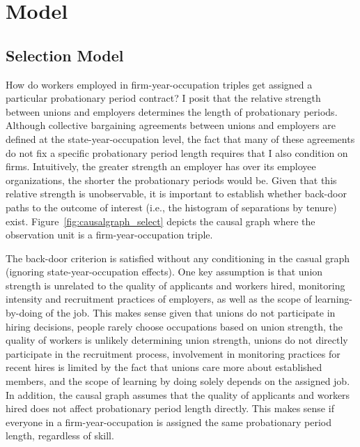 \documentclass[12pt]{article}
\begin{document}
\section{Model}

\subsection{Selection Model}

How do workers employed in firm-year-occupation triples get assigned a particular probationary period contract?
I posit that the relative strength between unions and employers determines the length of probationary periods.
Although collective bargaining agreements between unions and employers are defined at the state-year-occupation level, the fact that many of these agreements do not fix a specific probationary period length requires that I also condition on firms.
Intuitively, the greater strength an employer has over its employee organizations, the shorter the probationary periods would be.
Given that this relative strength is unobservable, it is important to establish whether back-door paths to the outcome of interest (i.e., the histogram of separations by tenure) exist.
Figure~\ref{fig:causalgraph_select} depicts the causal graph where the observation unit is a firm-year-occupation triple.

The back-door criterion is satisfied without any conditioning in the casual graph (ignoring state-year-occupation effects).
One key assumption is that union strength is unrelated to the quality of applicants and workers hired, monitoring intensity and recruitment practices of employers, as well as the scope of learning-by-doing of the job.
This makes sense given that unions do not participate in hiring decisions, people rarely choose occupations based on union strength, the quality of workers is unlikely determining union strength, unions do not directly participate in the recruitment process, involvement in monitoring practices for recent hires is limited by the fact that unions care more about established members, and the scope of learning by doing solely depends on the assigned job.
In addition, the causal graph assumes that the quality of applicants and workers hired does not affect probationary period length directly.
This makes sense if everyone in a firm-year-occupation is assigned the same probationary period length, regardless of skill.
\end{document}
